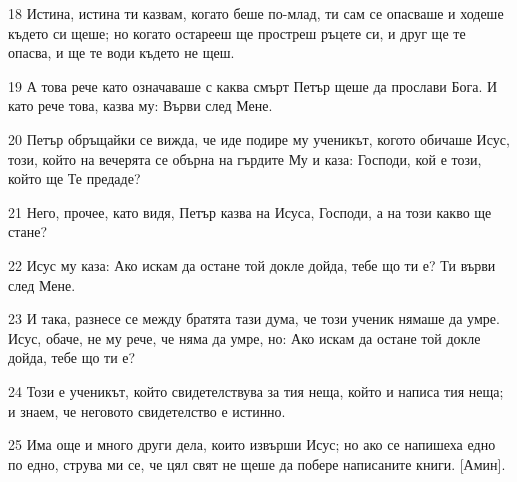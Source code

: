 \par 18 Истина, истина ти казвам, когато беше по-млад, ти сам се опасваше и ходеше където си щеше; но когато остарееш ще простреш ръцете си, и друг ще те опасва, и ще те води където не щеш.
\par 19 А това рече като означаваше с каква смърт Петър щеше да прослави Бога. И като рече това, казва му: Върви след Мене.
\par 20 Петър обръщайки се вижда, че иде подире му ученикът, когото обичаше Исус, този, който на вечерята се обърна на гърдите Му и каза: Господи, кой е този, който ще Те предаде?
\par 21 Него, прочее, като видя, Петър казва на Исуса, Господи, а на този какво ще стане?
\par 22 Исус му каза: Ако искам да остане той докле дойда, тебе що ти е? Ти върви след Мене.
\par 23 И така, разнесе се между братята тази дума, че този ученик нямаше да умре. Исус, обаче, не му рече, че няма да умре, но: Ако искам да остане той докле дойда, тебе що ти е?
\par 24 Този е ученикът, който свидетелствува за тия неща, който и написа тия неща; и знаем, че неговото свидетелство е истинно.
\par 25 Има още и много други дела, които извърши Исус; но ако се напишеха едно по едно, струва ми се, че цял свят не щеше да побере написаните книги. [Амин].

